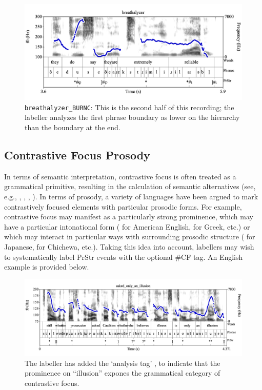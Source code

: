 \documentclass[11pt, twoside]{memoir}
\def\textlabel#1{{\relsize{-.5}\fontspec[Mapping=tex-text]{Roboto Mono}{#1}}}
\begin{document}
\begin{figure}[H]
\centering
%
\includegraphics[width=.875\linewidth]{PrStr-breathalyzer-2-adv.png}
%
\caption[The labeller analyzes the first phrase boundary as lower on the hierarchy than the boundary at the end.]{\texttt{breathalyzer\_BURNC}: This is the second half of this recording; the labeller analyzes the first phrase boundary as lower on the hierarchy than the boundary at the end.%
\label{fig:breathalyzer Beyond}%
}
\end{figure}

\subsection{Contrastive Focus Prosody}\label{sec:contrastive-focus-prosody}

In terms of semantic interpretation, contrastive focus is often treated as a grammatical primitive, resulting in the calculation of semantic alternatives (see, e.g., \citealt{rooth92}, \citealt{truckenbrodt95}, \citealt{wagner05}, \citealt{kratzerselkirk20}). In terms of prosody, a variety of languages have been argued to mark contrastively focused elements with particular prosodic forms. For example, contrastive focus may manifest as a particularly strong prominence, which may have a particular intonational form (\citealt{pierrehumberthirschberg90} for American English, \citealt{baltazanijun99} for Greek, etc.) or which may interact in particular ways with surrounding prosodic structure (\citealt{ishihara07} for Japanese, \citealt{kanerva90} for Chichewa, etc.). Taking this idea into account, labellers may wish to systematically label PrStr events with the optional \#CF tag. An English example is provided below.

\begin{figure}[H]
\centering
%
\includegraphics[width=.875\linewidth]{PrStr-asked_only_an_illusion-adv.png}
%
\caption{The labeller has added the ‘analysis tag’ \textlabel{\#CF}, to indicate that the prominence on “illusion” expones the grammatical category of contrastive focus.%
\label{fig:only_an_illusion Beyond}%
}
\end{figure}
\end{document}
